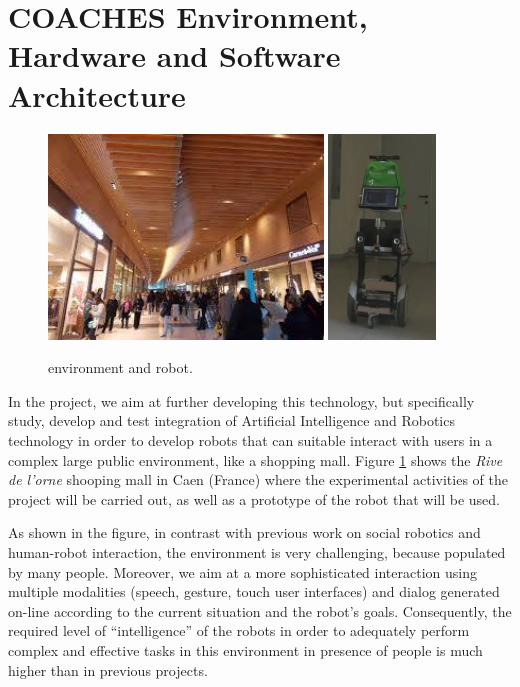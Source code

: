 \section{COACHES Environment, Hardware and Software Architecture}


\begin{figure}[t!]
\centering
\includegraphics[width=0.65\textwidth]{fig/rivedelorne}
\hspace{0.8cm}
\includegraphics[width=0.255\textwidth]{fig/diago1}
\caption{\coaches environment and robot.}
\label{fig:env}
\end{figure}

In the \coaches project, we aim at further developing this technology, but specifically study, develop and test integration of Artificial Intelligence and Robotics technology in order to develop robots that can suitable interact with users in a complex large public environment, like a shopping mall.
Figure \ref{fig:env} shows the \emph{Rive de l'orne} shooping mall in Caen (France) where the experimental activities of the project will be carried out, as well as a prototype of the robot that will be used.


As shown in the figure, in contrast with previous work on social robotics and human-robot interaction, the \coaches environment is very challenging, because populated by many people.
Moreover, we aim at a more sophisticated interaction using multiple modalities (speech, gesture, touch user interfaces) and dialog generated on-line according to the current situation
and the robot's goals.
Consequently, the required level of ``intelligence'' of the \coaches robots in order to adequately perform complex and effective tasks in this environment in presence of people is much higher than in previous projects.

